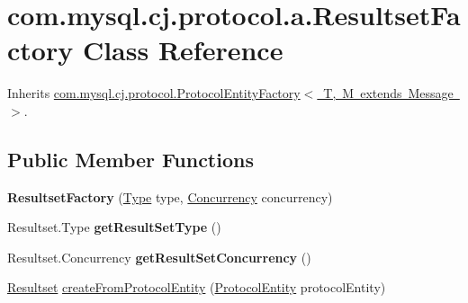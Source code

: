 \hypertarget{classcom_1_1mysql_1_1cj_1_1protocol_1_1a_1_1_resultset_factory}{}\section{com.\+mysql.\+cj.\+protocol.\+a.\+Resultset\+Factory Class Reference}
\label{classcom_1_1mysql_1_1cj_1_1protocol_1_1a_1_1_resultset_factory}


Inherits \mbox{\hyperlink{interfacecom_1_1mysql_1_1cj_1_1protocol_1_1_protocol_entity_factory}{com.\+mysql.\+cj.\+protocol.\+Protocol\+Entity\+Factory$<$ T, M extends Message $>$}}.

\subsection*{Public Member Functions}
\begin{DoxyCompactItemize}
\item 
\mbox{\label{classcom_1_1mysql_1_1cj_1_1protocol_1_1a_1_1_resultset_factory_a2c1f8425916165b5726504b5f1cdc194}} 
{\bfseries Resultset\+Factory} (\mbox{\hyperlink{enumcom_1_1mysql_1_1cj_1_1protocol_1_1_resultset_1_1_type}{Type}} type, \mbox{\hyperlink{enumcom_1_1mysql_1_1cj_1_1protocol_1_1_resultset_1_1_concurrency}{Concurrency}} concurrency)
\item 
\mbox{\label{classcom_1_1mysql_1_1cj_1_1protocol_1_1a_1_1_resultset_factory_a22c757bc4f5d57428ad2d34ee330cd66}} 
Resultset.\+Type {\bfseries get\+Result\+Set\+Type} ()
\item 
\mbox{\label{classcom_1_1mysql_1_1cj_1_1protocol_1_1a_1_1_resultset_factory_add802e01666fd1a41db44894232f912d}} 
Resultset.\+Concurrency {\bfseries get\+Result\+Set\+Concurrency} ()
\item 
\mbox{\hyperlink{interfacecom_1_1mysql_1_1cj_1_1protocol_1_1_resultset}{Resultset}} \mbox{\hyperlink{classcom_1_1mysql_1_1cj_1_1protocol_1_1a_1_1_resultset_factory_a3ee901bd2ae369a6c99f8c38c280c407}{create\+From\+Protocol\+Entity}} (\mbox{\hyperlink{interfacecom_1_1mysql_1_1cj_1_1protocol_1_1_protocol_entity}{Protocol\+Entity}} protocol\+Entity)
\end{DoxyCompactItemize}



